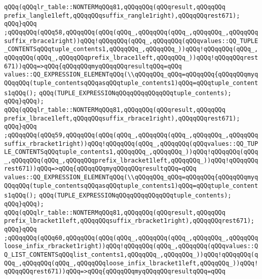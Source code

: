 \verb|qQQq(qQQqlr_table::NONTERMqQQq81,qQQqqQQq(qQQqresult,qQQqqQQq|\newline
\verb|prefix_langle1left,qQQqqQQqsuffix_rangle1right),qQQqqQQqrest671);|\newline
\verb|qQQq}qQQq|\newline
\verb|;qQQqqQQq(qQQq58,qQQqqQQq(qQQq(qQQq_,qQQqqQQq(qQQq_,qQQqqQQq_,qQQqqQQqsuffix_rbrace1right))qQQq!qQQqqQQq(qQQq_,qQQqqQQq(qQQqvalues::QQ_TUPLE_CONTENTSqQQqtuple_contents1,qQQqqQQq_,qQQqqQQq_))qQQq!qQQqqQQq(qQQq_,qQQqqQQq(qQQq_,qQQqqQQqprefix_lbrace1left,qQQqqQQq_))qQQq!qQQqqQQqrest671))qQQq=>qQQq{qQQqqQQqmyqQQqqQQqresultqQQq=qQQq|\newline
\verb|values::QQ_EXPRESSION_ELEMENTqQQq(\\qQQqqQQq_qQQq=qQQqqQQq{qQQqqQQqmyqQQqqQQq(tuple_contentsqQQqasqQQqtuple_contents1)qQQq=qQQqtuple_contents1qQQq();|\newline
\verb|qQQq(TUPLE_EXPRESSIONqQQqqQQqqQQqqQQqtuple_contents);|\newline
\verb|qQQq}qQQq);|\newline
\verb|qQQq(qQQqlr_table::NONTERMqQQq81,qQQqqQQq(qQQqresult,qQQqqQQq|\newline
\verb|prefix_lbrace1left,qQQqqQQqsuffix_rbrace1right),qQQqqQQqrest671);|\newline
\verb|qQQq}qQQq|\newline
\verb|;qQQqqQQq(qQQq59,qQQqqQQq(qQQq(qQQq_,qQQqqQQq(qQQq_,qQQqqQQq_,qQQqqQQqsuffix_rbracket1right))qQQq!qQQqqQQq(qQQq_,qQQqqQQq(qQQqvalues::QQ_TUPLE_CONTENTSqQQqtuple_contents1,qQQqqQQq_,qQQqqQQq_))qQQq!qQQqqQQq(qQQq_,qQQqqQQq(qQQq_,qQQqqQQqprefix_lbracket1left,qQQqqQQq_))qQQq!qQQqqQQqrest671))qQQq=>qQQq{qQQqqQQqmyqQQqqQQqresultqQQq=qQQq|\newline
\verb|values::QQ_EXPRESSION_ELEMENTqQQq(\\qQQqqQQq_qQQq=qQQqqQQq{qQQqqQQqmyqQQqqQQq(tuple_contentsqQQqasqQQqtuple_contents1)qQQq=qQQqtuple_contents1qQQq();|\newline
\verb|qQQq(TUPLE_EXPRESSIONqQQqqQQqqQQqqQQqtuple_contents);|\newline
\verb|qQQq}qQQq);|\newline
\verb|qQQq(qQQqlr_table::NONTERMqQQq81,qQQqqQQq(qQQqresult,qQQqqQQq|\newline
\verb|prefix_lbracket1left,qQQqqQQqsuffix_rbracket1right),qQQqqQQqrest671);|\newline
\verb|qQQq}qQQq|\newline
\verb|;qQQqqQQq(qQQq60,qQQqqQQq(qQQq(qQQq_,qQQqqQQq(qQQq_,qQQqqQQq_,qQQqqQQqloose_infix_rbracket1right))qQQq!qQQqqQQq(qQQq_,qQQqqQQq(qQQqvalues::QQ_LIST_CONTENTSqQQqlist_contents1,qQQqqQQq_,qQQqqQQq_))qQQq!qQQqqQQq(qQQq_,qQQqqQQq(qQQq_,qQQqqQQqloose_infix_lbracket1left,qQQqqQQq_))qQQq!qQQqqQQqrest671))qQQq=>qQQq{qQQqqQQqmyqQQqqQQqresultqQQq=qQQq|\newline
